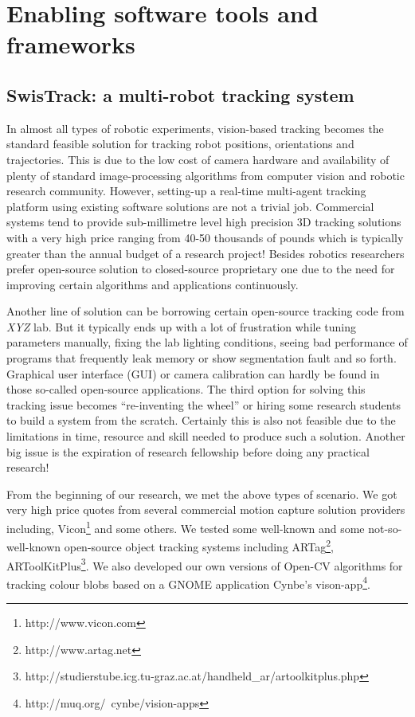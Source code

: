 \section{Enabling software tools and frameworks}
\subsection{SwisTrack: a multi-robot tracking system}
\label{expt-tools:swistrack}
In almost all types of robotic experiments, vision-based tracking becomes the standard feasible solution for tracking robot positions, orientations and trajectories. This is due to the low cost of camera hardware and availability of plenty of standard image-processing algorithms from computer vision and robotic research community. However, setting-up a real-time multi-agent tracking platform using existing software solutions are not a trivial job. Commercial systems tend to provide sub-millimetre level high precision 3D tracking solutions with a very high price ranging from  40-50 thousands of pounds which is typically greater than the annual budget of a research project! Besides robotics researchers prefer open-source solution to closed-source proprietary one due to the need for improving certain algorithms and applications continuously. 

Another line of solution can be borrowing certain open-source tracking code from \textit{XYZ} lab. But it typically ends up with a lot of frustration while tuning parameters manually, fixing the lab lighting conditions, seeing bad performance of programs that frequently leak memory or show segmentation fault and so forth. Graphical user interface (GUI) or camera calibration can hardly be found in those so-called open-source applications. The third option for solving this tracking issue becomes ``re-inventing the wheel'' or hiring some research students to build a system from the scratch. Certainly this is also not feasible due to the limitations in time, resource and skill needed to produce such a solution. Another big issue is the expiration of research fellowship before doing any practical research!

From the beginning of our research, we met the above types of scenario. We got very high price quotes from several commercial motion capture solution providers including, Vicon\footnote{http://www.vicon.com} and some others. We tested some well-known and some not-so-well-known open-source object tracking systems including ARTag\footnote{http://www.artag.net}, ARToolKitPlus\footnote{http://studierstube.icg.tu-graz.ac.at/handheld\_ar/artoolkitplus.php}. We also developed our own versions of Open-CV algorithms for tracking colour blobs based on a GNOME application Cynbe's vison-app\footnote{http://muq.org/~cynbe/vision-apps}. 

